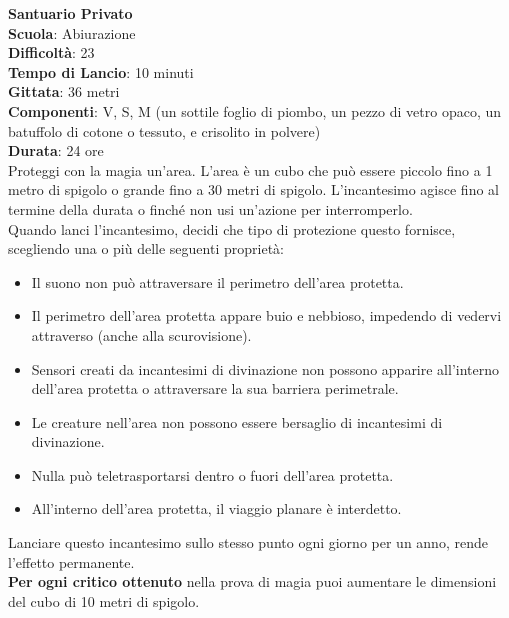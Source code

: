 \begin{multicols}{2}
\medskip\textbf{Santuario Privato}\\
\textbf{Scuola}: Abiurazione\\
\textbf{Difficoltà}: 23\\
\textbf{Tempo di Lancio}: 10 minuti\\
\textbf{Gittata}: 36 metri\\
\textbf{Componenti}: V, S, M (un sottile foglio di piombo, un pezzo di vetro opaco, un batuffolo di cotone o tessuto, e crisolito in polvere)\\
\textbf{Durata}: 24 ore \\
Proteggi con la magia un'area. L'area è un cubo che può essere piccolo fino a 1 metro di spigolo o grande fino a 30 metri di spigolo. L'incantesimo agisce fino al termine della durata o finché non usi un'azione per interromperlo.\\
Quando lanci l'incantesimo, decidi che tipo di protezione questo fornisce, scegliendo una o più delle seguenti proprietà:\\
\medskip
\begin{itemize}
\item
Il suono non può attraversare il perimetro dell'area protetta.
\item
Il perimetro dell'area protetta appare buio e nebbioso, impedendo di vedervi attraverso (anche
alla scurovisione).
\item
Sensori creati da incantesimi di divinazione non possono apparire all'interno dell'area protetta o attraversare la sua barriera perimetrale.
\item
Le creature nell'area non possono essere bersaglio di incantesimi di divinazione.
\item
Nulla può teletrasportarsi dentro o fuori dell'area protetta.
\item
All'interno dell'area protetta, il viaggio planare è interdetto.
\end{itemize}
Lanciare questo incantesimo sullo stesso punto ogni giorno per un anno, rende l'effetto permanente.\\
\textbf{Per ogni critico ottenuto} nella prova di magia puoi aumentare le dimensioni del cubo di 10 metri di spigolo.


\end{multicols}
